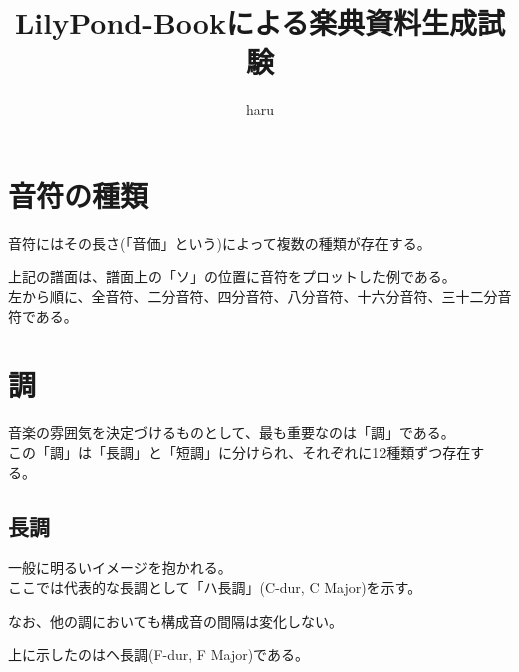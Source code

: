 \documentclass{ltjsarticle}
\begin{document}
\title{LilyPond-Bookによる楽典資料生成試験}
\author{haru}
\maketitle

\tableofcontents
\clearpage

\section{音符の種類}

音符にはその長さ(「音価」という)によって複数の種類が存在する。\\

{%
\parindent 0pt
\noindent
\ifx\preLilyPondExample \undefined
\else
  \expandafter\preLilyPondExample
\fi
\def\lilypondbook{}%
%
\ifx\postLilyPondExample \undefined
\else
  \expandafter\postLilyPondExample
\fi
}

上記の譜面は、譜面上の「ソ」の位置に音符をプロットした例である。 \\
左から順に、全音符、二分音符、四分音符、八分音符、十六分音符、三十二分音符である。

\section{調}

音楽の雰囲気を決定づけるものとして、最も重要なのは「調」である。\\
この「調」は「長調」と「短調」に分けられ、それぞれに12種類ずつ存在する。

\subsection{長調}

一般に明るいイメージを抱かれる。\\
ここでは代表的な長調として「ハ長調」(C-dur, C Major)を示す。

{%
\parindent 0pt
\noindent
\ifx\preLilyPondExample \undefined
\else
  \expandafter\preLilyPondExample
\fi
\def\lilypondbook{}%
%
\ifx\postLilyPondExample \undefined
\else
  \expandafter\postLilyPondExample
\fi
}

なお、他の調においても構成音の間隔は変化しない。

{%
\parindent 0pt
\noindent
\ifx\preLilyPondExample \undefined
\else
  \expandafter\preLilyPondExample
\fi
\def\lilypondbook{}%
%
\ifx\postLilyPondExample \undefined
\else
  \expandafter\postLilyPondExample
\fi
}

上に示したのはヘ長調(F-dur, F Major)である。
\end{document}
